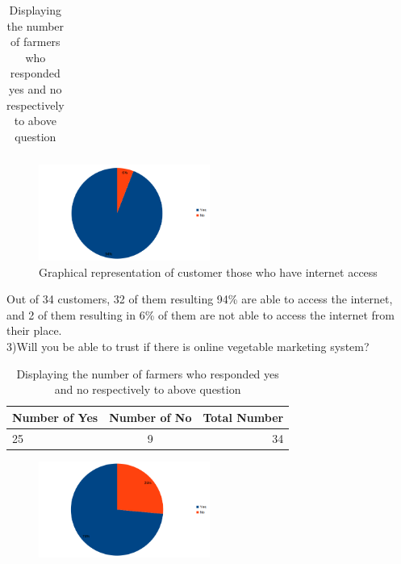 \documentclass[12pt]{report}
\begin{document}
\begin{normalsize}
\begin{table}[h]
\begin{tabular}{ | l | c | r | }
		\end{tabular}
		\caption{Displaying the number of farmers who responded yes and no respectively to above question}
		\label{5.0}
	    \end{table}
\begin{figure}[h]       %
	\centering
	\includegraphics[width=0.5\textwidth]{customer 2.png}
	\caption{ Graphical representation of customer those who have internet access }
	\label{myLabel}		%
	\end{figure}
	\newpage
Out of 34 customers, 32 of them resulting 94\% are able to access the internet, and 2 of them resulting in 6\% of them are not able to access the internet from their place.\newline\\[0.1cm]
3)Will you be able to trust if there is online vegetable marketing system?\newline\\[0.1cm]
\begin{table}[h]       %
		\centering
		\begin{tabular}{ | l | c | r | } \hline
		\textbf{Number of Yes} & \textbf{Number of No} & \textbf{Total Number} \\ \hline			
		25 & 9 & 34 \\ \hline
		\end{tabular}
		\caption{Displaying the number of farmers who responded yes and no respectively to above question}
		\label{5.0}
	    \end{table}
\begin{figure}[h]       %
	\centering
	\includegraphics[width=0.5\textwidth]{customer 3.png}

\end{figure}
\end{normalsize}
\end{document}
